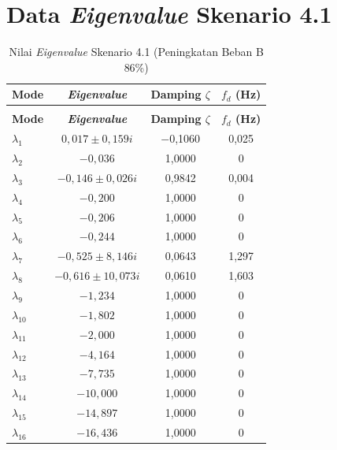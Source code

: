 \section{Data \textit{Eigenvalue} Skenario 4.1}
\begingroup
\fontsize{11}{13.2}\selectfont
\setlength{\tabcolsep}{7pt}
\begin{longtable}{>{\centering\arraybackslash}m{1.5cm} c c c} \caption[]{Nilai
	\textit{Eigenvalue} Skenario 4.1 (Peningkatan Beban B 86\%)}
	\label{tab:eigenvalue_sk41_lampiran} \\
	\toprule
	\textbf{Mode} & \textbf{\textit{Eigenvalue}} & \textbf{Damping $\zeta$} &
	\textbf{$f_d$ (Hz)} \\
	\midrule
	\endfirsthead
	\multicolumn{4}{l}{\textit{(lanjutan)}} \\
	\toprule
	\textbf{Mode} & \textbf{\textit{Eigenvalue}} & \textbf{Damping $\zeta$} &
	\textbf{$f_d$ (Hz)} \\
	\midrule
	\endhead
	\bottomrule
	\endfoot
	$\lambda_1$  & $0{,}017 \pm 0{,}159i$          & $-$0,1060 & 0,025 \\
	$\lambda_2$  & $-0{,}036$                       & 1,0000 & 0 \\
	$\lambda_3$  & $-0{,}146 \pm 0{,}026i$          & 0,9842 & 0,004 \\
	$\lambda_4$  & $-0{,}200$                       & 1,0000 & 0 \\
	$\lambda_5$  & $-0{,}206$                       & 1,0000 & 0 \\
	$\lambda_6$  & $-0{,}244$                       & 1,0000 & 0 \\
	$\lambda_7$  & $-0{,}525 \pm 8{,}146i$          & 0,0643 & 1,297 \\
	$\lambda_8$  & $-0{,}616 \pm 10{,}073i$         & 0,0610 & 1,603 \\
	$\lambda_9$  & $-1{,}234$                       & 1,0000 & 0 \\
	$\lambda_{10}$ & $-1{,}802$                     & 1,0000 & 0 \\
	$\lambda_{11}$ & $-2{,}000$                     & 1,0000 & 0 \\
	$\lambda_{12}$ & $-4{,}164$                     & 1,0000 & 0 \\
	$\lambda_{13}$ & $-7{,}735$                     & 1,0000 & 0 \\
	$\lambda_{14}$ & $-10{,}000$                    & 1,0000 & 0 \\
	$\lambda_{15}$ & $-14{,}897$                    & 1,0000 & 0 \\
	$\lambda_{16}$ & $-16{,}436$                    & 1,0000 & 0 \\

\end{longtable}

